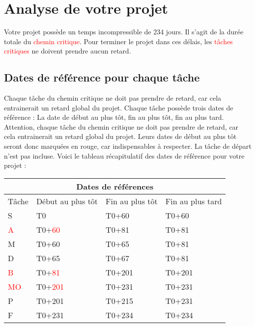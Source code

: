 \documentclass{article}
\begin{document}
\section{Analyse de votre projet}
Votre projet possède un temps incompressible de 234 jours.
    Il s'agit de la durée totale du \textcolor{red}{chemin critique}.
    Pour terminer le projet dans ces délais, les \textcolor{red}{tâches critiques} ne doivent prendre aucun retard.\subsection{Dates de référence pour chaque tâche}Chaque tâche du chemin critique ne doit pas prendre de
    retard, car cela entrainerait un retard global du projet. 
    Chaque tâche possède trois dates de référence : La date de début au plus tôt,
    fin au plus tôt, fin au plus tard.
    Attention, chaque tâche du chemin critique ne doit pas prendre de
    retard, car cela entrainerait un retard global du projet.
    Leurs dates de début au plus tôt seront donc marquées en rouge,
    car indispensables à respecter. La tâche de départ n'est pas incluse. \newpage
    Voici le tableau récapitulatif des dates de référence pour votre projet :\newline 
\begin{tabular}{ |p{3cm}||p{3cm}|p{3cm}|p{3cm}|  }
        \hline
        \multicolumn{4}{|c|}{Dates de références} \\
        \hline 
        Tâche&Début au plus tôt&Fin au plus tôt&Fin au plus tard \\ 
        \hline 
S&T0&T0+60&T0+60 \\ 
\textcolor{red}{A}&T0+\textcolor{red}{60}&T0+81&T0+81 \\ 
M&T0+60&T0+65&T0+81 \\ 
D&T0+65&T0+67&T0+81 \\ 
\textcolor{red}{B}&T0+\textcolor{red}{81}&T0+201&T0+201 \\ 
\textcolor{red}{MO}&T0+\textcolor{red}{201}&T0+231&T0+231 \\ 
P&T0+201&T0+215&T0+231 \\ 
F&T0+231&T0+234&T0+234 \\ 
\hline
    \end{tabular} 
\end{document}
